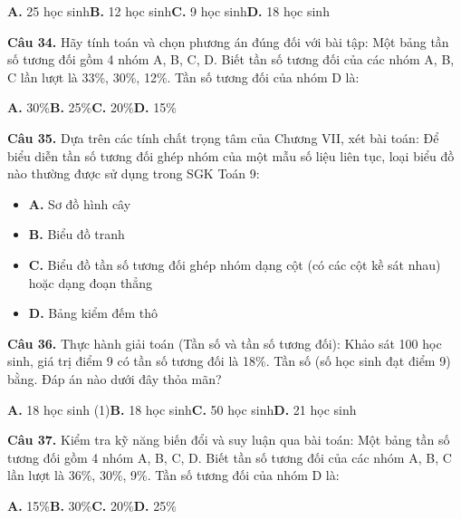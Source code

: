 \documentclass[11pt,a4paper]{article}
\begin{document}
\hspace*{1.5em}\textbf{A.} 25 học sinh\quad\quad \textbf{B.} 12 học sinh\quad\quad \textbf{C.} 9 học sinh\quad\quad \textbf{D.} 18 học sinh\par\vspace{2pt}
\textbf{\color{primary} Câu 34.} Hãy tính toán và chọn phương án đúng đối với bài tập: Một bảng tần số tương đối gồm 4 nhóm A, B, C, D. Biết tần số tương đối của các nhóm A, B, C lần lượt là 33\%, 30\%, 12\%. Tần số tương đối của nhóm D là:\par
\hspace*{1.5em}\textbf{A.} 30\%\quad\quad \textbf{B.} 25\%\quad\quad \textbf{C.} 20\%\quad\quad \textbf{D.} 15\%\par\vspace{2pt}
\textbf{\color{primary} Câu 35.} Dựa trên các tính chất trọng tâm của Chương VII, xét bài toán: Để biểu diễn tần số tương đối ghép nhóm của một mẫu số liệu liên tục, loại biểu đồ nào thường được sử dụng trong SGK Toán 9:\par
\begin{itemize}\setlength{\itemsep}{1pt}\setlength{\parskip}{0pt}
  \item[] \textbf{A.} Sơ đồ hình cây
  \item[] \textbf{B.} Biểu đồ tranh
  \item[] \textbf{C.} Biểu đồ tần số tương đối ghép nhóm dạng cột (có các cột kề sát nhau) hoặc dạng đoạn thẳng
  \item[] \textbf{D.} Bảng kiểm đếm thô
\end{itemize}\vspace{2pt}
\textbf{\color{primary} Câu 36.} Thực hành giải toán (Tần số và tần số tương đối): Khảo sát 100 học sinh, giá trị điểm 9 có tần số tương đối là 18\%. Tần số (số học sinh đạt điểm 9) bằng. Đáp án nào dưới đây thỏa mãn?\par
\hspace*{1.5em}\textbf{A.} 18 học sinh (1)\quad\quad \textbf{B.} 18 học sinh\quad\quad \textbf{C.} 50 học sinh\quad\quad \textbf{D.} 21 học sinh\par\vspace{2pt}
\textbf{\color{primary} Câu 37.} Kiểm tra kỹ năng biến đổi và suy luận qua bài toán: Một bảng tần số tương đối gồm 4 nhóm A, B, C, D. Biết tần số tương đối của các nhóm A, B, C lần lượt là 36\%, 30\%, 9\%. Tần số tương đối của nhóm D là:\par
\hspace*{1.5em}\textbf{A.} 15\%\quad\quad \textbf{B.} 30\%\quad\quad \textbf{C.} 20\%\quad\quad \textbf{D.} 25\%\par\vspace{2pt}
\end{document}
